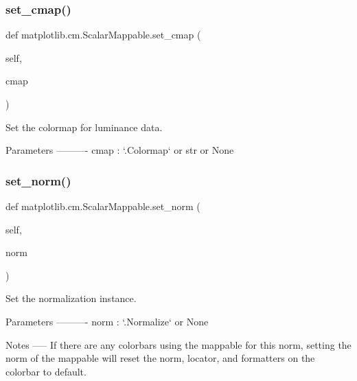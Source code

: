 \subsubsection{\texorpdfstring{set\+\_\+cmap()}{set\_cmap()}}
{\footnotesize\ttfamily def matplotlib.\+cm.\+Scalar\+Mappable.\+set\+\_\+cmap (\begin{DoxyParamCaption}\item[{}]{self,  }\item[{}]{cmap }\end{DoxyParamCaption})}

\begin{DoxyVerb}Set the colormap for luminance data.

Parameters
----------
cmap : `.Colormap` or str or None
\end{DoxyVerb}
 \mbox{\label{classmatplotlib_1_1cm_1_1ScalarMappable_a855361dd276d7e81483fe7f2785d3361}} 
\subsubsection{\texorpdfstring{set\+\_\+norm()}{set\_norm()}}
{\footnotesize\ttfamily def matplotlib.\+cm.\+Scalar\+Mappable.\+set\+\_\+norm (\begin{DoxyParamCaption}\item[{}]{self,  }\item[{}]{norm }\end{DoxyParamCaption})}

\begin{DoxyVerb}Set the normalization instance.

Parameters
----------
norm : `.Normalize` or None

Notes
-----
If there are any colorbars using the mappable for this norm, setting
the norm of the mappable will reset the norm, locator, and formatters
on the colorbar to default.
\end{DoxyVerb}
 \mbox{\label{classmatplotlib_1_1cm_1_1ScalarMappable_ae1a5e804a3197912a9df293d07b2e272}} 
